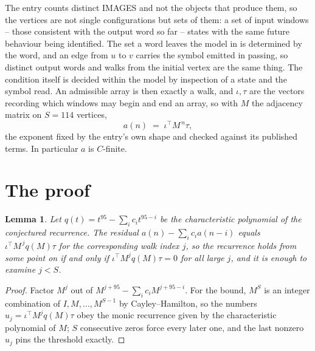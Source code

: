 \documentclass[11pt,a4paper]{article}
\theoremstyle{plain}
\newtheorem{lemma}[theorem]{Lemma}
\theoremstyle{definition}
\begin{document}
The entry counts distinct IMAGES and not the objects that produce them, so the vertices are not single configurations but sets of them: a set of input windows -- those consistent with the output word so far -- states with the same future behaviour being identified. The set a word leaves the model in is determined by the word, and an edge from $u$ to $v$ carries the symbol emitted in passing, so distinct output words and walks from the initial vertex are the same thing. The condition itself is decided within the model by inspection of a state and the symbol read.
An admissible array is then exactly a walk, and $\iota,\tau$ are the vectors recording which windows may begin and end an array, so with $M$ the adjacency matrix on $S=114$ vertices,
\[
a(n)\;=\;\iota^{\!\top}M^{\,n}\tau ,
\]
the exponent fixed by the entry's own shape and checked against its published terms. In
particular $a$ is $C$-finite.

\section{The proof}

\begin{lemma}\label{lem:crit}
Let $q(t)=t^{95}-\sum_i c_it^{95-i}$ be the characteristic polynomial of the
conjectured recurrence. The residual $a(n)-\sum_ic_ia(n-i)$ equals
$\iota^{\!\top}M^{\,j}q(M)\tau$ for the corresponding walk index $j$, so the recurrence
holds from some point on if and only if $\iota^{\!\top}M^{j}q(M)\tau=0$ for all large $j$,
and it is enough to examine $j<S$.
\end{lemma}

\begin{proof}
Factor $M^{j}$ out of $M^{j+95}-\sum_ic_iM^{j+95-i}$. For the bound, $M^{S}$
is an integer combination of $I,M,\dots,M^{S-1}$ by Cayley--Hamilton, so the numbers
$u_j=\iota^{\!\top}M^{j}q(M)\tau$ obey the monic recurrence given by the characteristic
polynomial of $M$; $S$ consecutive zeros force every later one, and the last nonzero $u_j$
pins the threshold exactly.
\end{proof}
\end{document}
